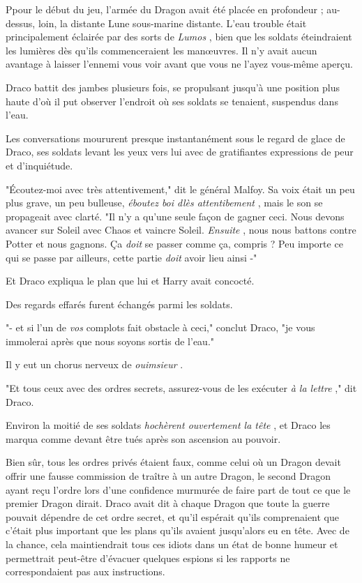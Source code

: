 Ppour le début du jeu, l'armée du Dragon avait été placée en profondeur ; au-dessus, loin, la distante Lune sous-marine distante. L'eau trouble était principalement éclairée par des sorts de \emph{Lumos} , bien que les soldats éteindraient les lumières dès qu'ils commenceraient les manœuvres. Il n'y avait aucun avantage à laisser l'ennemi vous voir avant que vous ne l'ayez vous-même aperçu.

Draco battit des jambes plusieurs fois, se propulsant jusqu'à une position plus haute d'où il put observer l'endroit où ses soldats se tenaient, suspendus dans l'eau.

Les conversations moururent presque instantanément sous le regard de glace de Draco, ses soldats levant les yeux vers lui avec de gratifiantes expressions de peur et d'inquiétude.

"Écoutez-moi avec très attentivement," dit le général Malfoy. Sa voix était un peu plus grave, un peu bulleuse, \emph{éboutez boi dlès attentibement} , mais le son se propageait avec clarté. "Il n'y a qu'une seule façon de gagner ceci. Nous devons avancer sur Soleil avec Chaos et vaincre Soleil. \emph{Ensuite} , nous nous battons contre Potter et nous gagnons. Ça \emph{doit}  se passer comme ça, compris ? Peu importe ce qui se passe par ailleurs, cette partie \emph{doit}  avoir lieu ainsi -"

Et Draco expliqua le plan que lui et Harry avait concocté.

Des regards effarés furent échangés parmi les soldats.

"- et si l'un de \emph{vos}  complots fait obstacle à ceci," conclut Draco, "je vous immolerai après que nous soyons sortis de l'eau."

Il y eut un chorus nerveux de \emph{ouimsieur} .

"Et tous ceux avec des ordres secrets, assurez-vous de les exécuter \emph{à la lettre} ," dit Draco.

Environ la moitié de ses soldats \emph{hochèrent ouvertement la tête} , et Draco les marqua comme devant être tués après son ascension au pouvoir.

Bien sûr, tous les ordres privés étaient faux, comme celui où un Dragon devait offrir une fausse commission de traître à un autre Dragon, le second Dragon ayant reçu l'ordre lors d'une confidence murmurée de faire part de tout ce que le premier Dragon dirait. Draco avait dit à chaque Dragon que toute la guerre pouvait dépendre de cet ordre secret, et qu'il espérait qu'ils comprenaient que c'était plus important que les plans qu'ils avaient jusqu'alors eu en tête. Avec de la chance, cela maintiendrait tous ces idiots dans un état de bonne humeur et permettrait peut-être d'évacuer quelques espions si les rapports ne correspondaient pas aux instructions.

